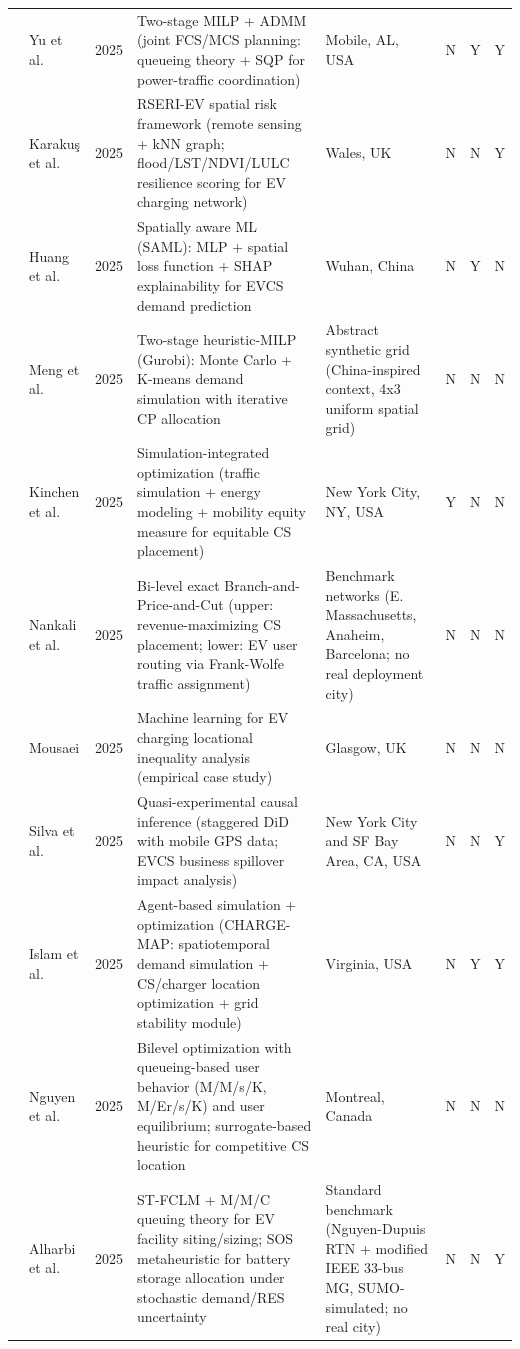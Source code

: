 \documentclass[letterpaper, 12pt, oneside, doublespacing]{Thesis}
\begin{document}
\begin{longtable}{L{0.9cm} L{1.8cm} L{0.7cm} L{2.5cm} L{2.1cm} L{0.7cm} L{0.7cm} L{0.7cm}}
\cite{a_joint_2025} & Yu et al. & 2025 & Two-stage MILP + ADMM (joint FCS/MCS planning: queueing theory + SQP for power-traffic coordination) & Mobile, AL, USA & N & Y & Y \\
\cite{a_multi-modal_2025} & Karaku\c{s} et al. & 2025 & RSERI-EV spatial risk framework (remote sensing + kNN graph; flood/LST/NDVI/LULC resilience scoring for EV charging network) & Wales, UK & N & N & Y \\
\cite{a_spatially_2025} & Huang et al. & 2025 & Spatially aware ML (SAML): MLP + spatial loss function + SHAP explainability for EVCS demand prediction & Wuhan, China & N & Y & N \\
\cite{a_two-stage_2025} & Meng et al. & 2025 & Two-stage heuristic-MILP (Gurobi): Monte Carlo + K-means demand simulation with iterative CP allocation & Abstract synthetic grid (China-inspired context, 4x3 uniform spatial grid) & N & N & N \\
\cite{a_united_2025} & Kinchen et al. & 2025 & Simulation-integrated optimization (traffic simulation + energy modeling + mobility equity measure for equitable CS placement) & New York City, NY, USA & Y & N & N \\
\cite{an_exact_2025} & Nankali et al. & 2025 & Bi-level exact Branch-and-Price-and-Cut (upper: revenue-maximizing CS placement; lower: EV user routing via Frank-Wolfe traffic assignment) & Benchmark networks (E. Massachusetts, Anaheim, Barcelona; no real deployment city) & N & N & N \\
\cite{analyzing_locational_2025} & Mousaei & 2025 & Machine learning for EV charging locational inequality analysis (empirical case study) & Glasgow, UK & N & N & N \\
\cite{causal_spillover_2025} & Silva et al. & 2025 & Quasi-experimental causal inference (staggered DiD with mobile GPS data; EVCS business spillover impact analysis) & New York City and SF Bay Area, CA, USA & N & N & Y \\
\cite{charge-map_an_2025} & Islam et al. & 2025 & Agent-based simulation + optimization (CHARGE-MAP: spatiotemporal demand simulation + CS/charger location optimization + grid stability module) & Virginia, USA & N & Y & Y \\
\cite{competitive_ev_2025} & Nguyen et al. & 2025 & Bilevel optimization with queueing-based user behavior (M/M/s/K, M/Er/s/K) and user equilibrium; surrogate-based heuristic for competitive CS location & Montreal, Canada & N & N & N \\
\cite{data-driven_ev_2025} & Alharbi et al. & 2025 & ST-FCLM + M/M/C queuing theory for EV facility siting/sizing; SOS metaheuristic for battery storage allocation under stochastic demand/RES uncertainty & Standard benchmark (Nguyen-Dupuis RTN + modified IEEE 33-bus MG, SUMO-simulated; no real city) & N & N & Y \\

\end{longtable}
\end{document}
